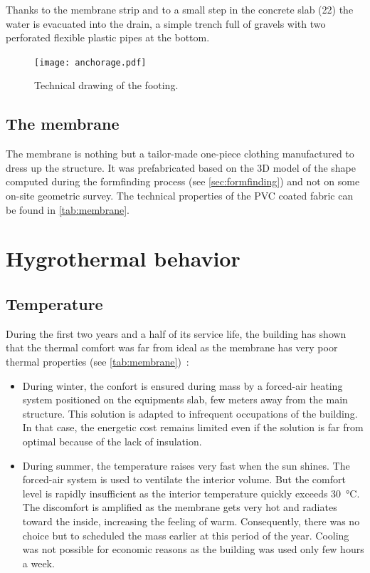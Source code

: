 Thanks to the membrane strip and to a small step in the concrete slab (22) the water is evacuated into the drain, a simple trench full of gravels with two perforated flexible plastic pipes at the bottom.

\begin{figure}[!b]
	\centering
	\begin{fullpage}
	\texttt{[image: anchorage.pdf]}
	\caption{Technical drawing of the footing.}
	\label{fig:anchorage_dwg}
	\end{fullpage}
\end{figure}

\subsection{The membrane}
The membrane is nothing but a tailor-made one-piece clothing manufactured to dress up the structure. It was prefabricated based on the 3D model of the shape computed during the formfinding process (see \cref{sec:formfinding}) and not on some on-site geometric survey. The technical properties of the PVC coated fabric can be found in \cref{tab:membrane}.

\clearpage
\section{Hygrothermal behavior}
\subsection{Temperature}\label{sec:temperature}
During the first two years and a half of its service life, the building has shown that the thermal comfort was far from ideal as the membrane has very poor thermal properties (see \cref{tab:membrane})~:
\begin{itemize}
\item During winter, the confort is ensured during mass by a forced-air heating system positioned on the equipments slab, few meters away from the main structure. This solution is adapted to infrequent occupations of the building. In that case, the energetic cost remains limited even if the solution is far from optimal because of the lack of insulation.
\item During summer, the temperature raises very fast when the sun shines. The forced-air system is used to ventilate the interior volume. But the comfort level is rapidly insufficient as the interior temperature quickly exceeds \SI{30}{\celsius}. The discomfort is amplified as the membrane gets very hot and radiates toward the inside, increasing the feeling of warm. Consequently, there was no choice but to scheduled the mass earlier at this period of the year. Cooling was not possible for economic reasons as the building was used only few hours a week.
\end{itemize}

